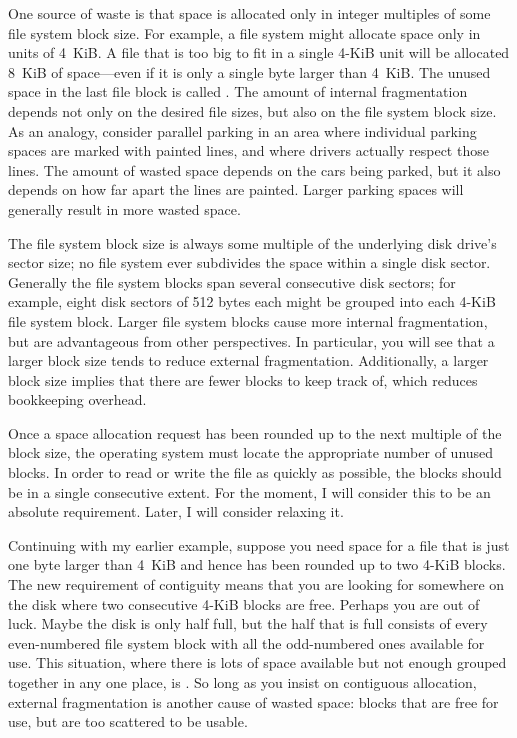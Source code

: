 One source of waste is that space is allocated only in integer
multiples of some file system block size.  For example, a file system
might allocate space only in units of 4~KiB.  A file that is too big to
fit in a single 4-KiB unit will be allocated 8~KiB of space---even if it
is only a single byte larger than 4~KiB.  The unused space in the last
file block is called .  The
amount of internal fragmentation depends not only on the desired file sizes,
but also on the file system block size.  As an analogy, consider
parallel parking in an area where individual parking spaces are marked
with painted lines, and where drivers actually respect those lines.
The amount of wasted space depends on the cars being parked, but it
also depends on how far apart the lines are painted.  Larger parking
spaces will generally result in more wasted space.

The file system block size is always some multiple of the underlying
disk drive's sector size; no file system ever subdivides the space
within a single disk sector.  Generally the file system blocks span
several consecutive disk sectors; for example, eight disk sectors of 512
bytes each might be grouped into each 4-KiB file system block.  Larger
file system blocks cause more internal fragmentation, but are
advantageous from other perspectives.  In particular, you will see that
a larger block size tends to reduce
external fragmentation.
Additionally, a larger block size implies that there are fewer blocks
to keep track of, which reduces bookkeeping overhead.

Once a space allocation request has been rounded up to the next
multiple of the block size, the operating system must locate the
appropriate number of unused blocks.  In order to read or write the
file as quickly as possible, the blocks should be in a single
consecutive extent.  For the moment, I will consider this to be an
absolute requirement.  Later, I will consider relaxing it.

Continuing with my earlier example, suppose you need space for a file
that is just one byte larger than 4~KiB and hence has been rounded up
to two 4-KiB blocks.  The new requirement of contiguity means that you
are looking for somewhere on the disk where two consecutive 4-KiB blocks
are free.  Perhaps you are out of luck.  Maybe the disk is only half
full, but the half that is full consists of every even-numbered file
system block with all the odd-numbered ones available for use.  This
situation, where there is lots of space available but not enough
grouped together in any one place, is .  So
long as you insist on contiguous allocation, external fragmentation is
another cause of wasted space: blocks that are free for use, but are
too scattered to be usable.

